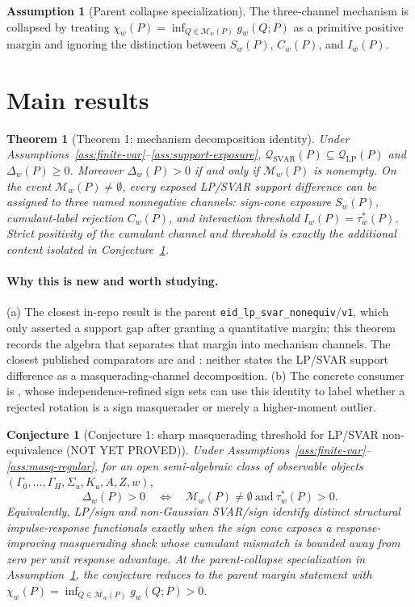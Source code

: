 \documentclass[11pt]{article}
\theoremstyle{definition}
\newtheorem{assumption}{Assumption}
\theoremstyle{plain}
\newtheorem{theorem}{Theorem}
\newtheorem{conjecture}{Conjecture}
\theoremstyle{remark}
\begin{document}
\begin{assumption}[Parent collapse specialization]\label{ass:parent-collapse}
The three-channel mechanism is collapsed by treating \(\chi_w(P)=\inf_{Q\in\mathcal M_w(P)}g_w(Q;P)\) as a primitive positive margin and ignoring the distinction between \(S_w(P)\), \(C_w(P)\), and \(I_w(P)\).
\end{assumption}

\section{Main results}
\begin{theorem}[Theorem 1: mechanism decomposition identity]\label{thm:mechanism-identity}
Under Assumptions~\ref{ass:finite-var}--\ref{ass:support-exposure}, \(\mathcal Q_{\mathrm{SVAR}}(P)\subseteq\mathcal Q_{\mathrm{LP}}(P)\) and \(\Delta_w(P)\ge0\).  Moreover \(\Delta_w(P)>0\) if and only if \(\mathcal M_w(P)\) is nonempty.  On the event \(\mathcal M_w(P)\ne\emptyset\), every exposed LP/SVAR support difference can be assigned to three named nonnegative channels: sign-cone exposure \(S_w(P)\), cumulant-label rejection \(C_w(P)\), and interaction threshold \(I_w(P)=\tau_w^*(P)\).  Strict positivity of the cumulant channel and threshold is exactly the additional content isolated in Conjecture~\ref{conj:masquerading-threshold}.
\end{theorem}
\paragraph{Why this is new and worth studying.}
(a) The closest in-repo result is the parent \texttt{eid\_lp\_svar\_nonequiv}/\texttt{v1}, which only asserted a support gap after granting a quantitative margin; this theorem records the algebra that separates that margin into mechanism channels.  The closest published comparators are \citet{PlagborgMollerWolf2021} and \citet{Wolf2022}: neither states the LP/SVAR support difference as a masquerading-channel decomposition.  (b) The concrete consumer is \citet{DrautzburgWright2023}, whose independence-refined sign sets can use this identity to label whether a rejected rotation is a sign masquerader or merely a higher-moment outlier.

\begin{conjecture}[Conjecture 1: sharp masquerading threshold for LP/SVAR non-equivalence (NOT YET PROVED)]\label{conj:masquerading-threshold}
Under Assumptions~\ref{ass:finite-var}--\ref{ass:masq-regular}, for an open semi-algebraic class of observable objects \((\Gamma_0,\ldots,\Gamma_H,\Sigma_u,K_u,A,Z,w)\),
\[
\Delta_w(P)>0
\quad\Longleftrightarrow\quad
\mathcal M_w(P)\ne\emptyset\ \text{and}\ \tau_w^*(P)>0.
\]
Equivalently, LP/sign and non-Gaussian SVAR/sign identify distinct structural impulse-response functionals exactly when the sign cone exposes a response-improving masquerading shock whose cumulant mismatch is bounded away from zero per unit response advantage.  At the parent-collapse specialization in Assumption~\ref{ass:parent-collapse}, the conjecture reduces to the parent margin statement with \(\chi_w(P)=\inf_{Q\in\mathcal M_w(P)}g_w(Q;P)>0\).
\end{conjecture}
\end{document}
